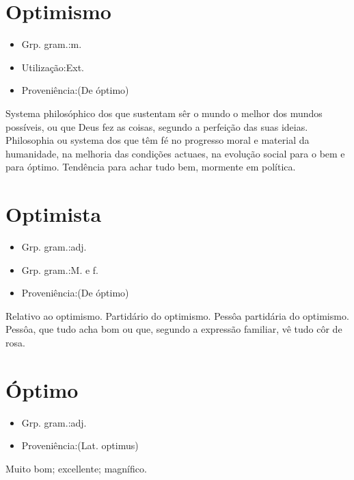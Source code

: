 \section{Optimismo}
\begin{itemize}
\item {Grp. gram.:m.}
\end{itemize}
\begin{itemize}
\item {Utilização:Ext.}
\end{itemize}
\begin{itemize}
\item {Proveniência:(De \textunderscore óptimo\textunderscore )}
\end{itemize}
Systema philosóphico dos que sustentam sêr o mundo o melhor dos mundos possíveis, ou que Deus fez as coisas, segundo a perfeição das suas ideias.
Philosophia ou systema dos que têm fé no progresso moral e material da humanidade, na melhoria das condições actuaes, na evolução social para o bem e para óptimo.
Tendência para achar tudo bem, mormente em política.
\section{Optimista}
\begin{itemize}
\item {Grp. gram.:adj.}
\end{itemize}
\begin{itemize}
\item {Grp. gram.:M.  e  f.}
\end{itemize}
\begin{itemize}
\item {Proveniência:(De \textunderscore óptimo\textunderscore )}
\end{itemize}
Relativo ao optimismo.
Partidário do optimismo.
Pessôa partidária do optimismo.
Pessôa, que tudo acha bom ou que, segundo a expressão familiar, vê tudo côr de rosa.
\section{Óptimo}
\begin{itemize}
\item {Grp. gram.:adj.}
\end{itemize}
\begin{itemize}
\item {Proveniência:(Lat. \textunderscore optimus\textunderscore )}
\end{itemize}
Muito bom; excellente; magnífico.

